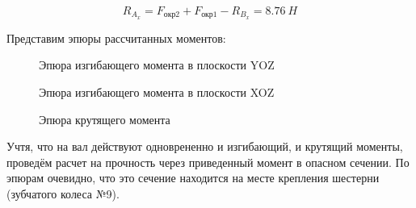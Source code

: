 \documentclass[14pt,a4paper,russian]{scrartcl}
\begin{document}
        \[ R_{A_x} = F_{\text{окр2}} + F_{\text{окр1}} - R_{B_x} = 8.76\ H\]

        Представим эпюры рассчитанных моментов:
 
        \begin{figure}[!h]
            \caption{Эпюра изгибающего момента в плоскости YOZ}
        \end{figure}

        \begin{figure}[h]
            \caption{Эпюра изгибающего момента в плоскости XOZ}
        \end{figure}
        \begin{figure}[h]
            \caption{Эпюра крутящего момента}
        \end{figure}

        Учтя, что на вал действуют одноврененно и изгибающий, и крутящий моменты,
        проведём расчет на прочность через приведенный момент в опасном сечении.
        По эпюрам очевидно, что это сечение находится на месте крепления шестерни
        (зубчатого колеса №9).
\end{document}
